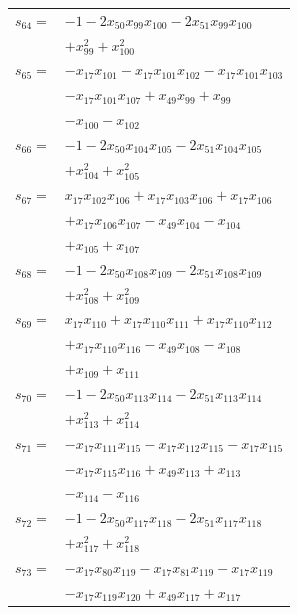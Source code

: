 \begin{longtable}{@{}r@{\;}l@{}}
\(s_{64}=\) & \(\displaystyle -1 -2x_{50}x_{99}x_{100} -2x_{51}x_{99}x_{100}\) \\
 & \(\displaystyle +x_{99}^{2} +x_{100}^{2}\) \\[3pt]
\(s_{65}=\) & \(\displaystyle -x_{17}x_{101} -x_{17}x_{101}x_{102} -x_{17}x_{101}x_{103}\) \\
 & \(\displaystyle -x_{17}x_{101}x_{107} +x_{49}x_{99} +x_{99}\) \\
 & \(\displaystyle -x_{100} -x_{102}\) \\[3pt]
\(s_{66}=\) & \(\displaystyle -1 -2x_{50}x_{104}x_{105} -2x_{51}x_{104}x_{105}\) \\
 & \(\displaystyle +x_{104}^{2} +x_{105}^{2}\) \\[3pt]
\(s_{67}=\) & \(\displaystyle x_{17}x_{102}x_{106} +x_{17}x_{103}x_{106} +x_{17}x_{106}\) \\
 & \(\displaystyle +x_{17}x_{106}x_{107} -x_{49}x_{104} -x_{104}\) \\
 & \(\displaystyle +x_{105} +x_{107}\) \\[3pt]
\(s_{68}=\) & \(\displaystyle -1 -2x_{50}x_{108}x_{109} -2x_{51}x_{108}x_{109}\) \\
 & \(\displaystyle +x_{108}^{2} +x_{109}^{2}\) \\[3pt]
\(s_{69}=\) & \(\displaystyle x_{17}x_{110} +x_{17}x_{110}x_{111} +x_{17}x_{110}x_{112}\) \\
 & \(\displaystyle +x_{17}x_{110}x_{116} -x_{49}x_{108} -x_{108}\) \\
 & \(\displaystyle +x_{109} +x_{111}\) \\[3pt]
\(s_{70}=\) & \(\displaystyle -1 -2x_{50}x_{113}x_{114} -2x_{51}x_{113}x_{114}\) \\
 & \(\displaystyle +x_{113}^{2} +x_{114}^{2}\) \\[3pt]
\(s_{71}=\) & \(\displaystyle -x_{17}x_{111}x_{115} -x_{17}x_{112}x_{115} -x_{17}x_{115}\) \\
 & \(\displaystyle -x_{17}x_{115}x_{116} +x_{49}x_{113} +x_{113}\) \\
 & \(\displaystyle -x_{114} -x_{116}\) \\[3pt]
\(s_{72}=\) & \(\displaystyle -1 -2x_{50}x_{117}x_{118} -2x_{51}x_{117}x_{118}\) \\
 & \(\displaystyle +x_{117}^{2} +x_{118}^{2}\) \\[3pt]
\(s_{73}=\) & \(\displaystyle -x_{17}x_{80}x_{119} -x_{17}x_{81}x_{119} -x_{17}x_{119}\) \\
 & \(\displaystyle -x_{17}x_{119}x_{120} +x_{49}x_{117} +x_{117}\) \\

\end{longtable}
